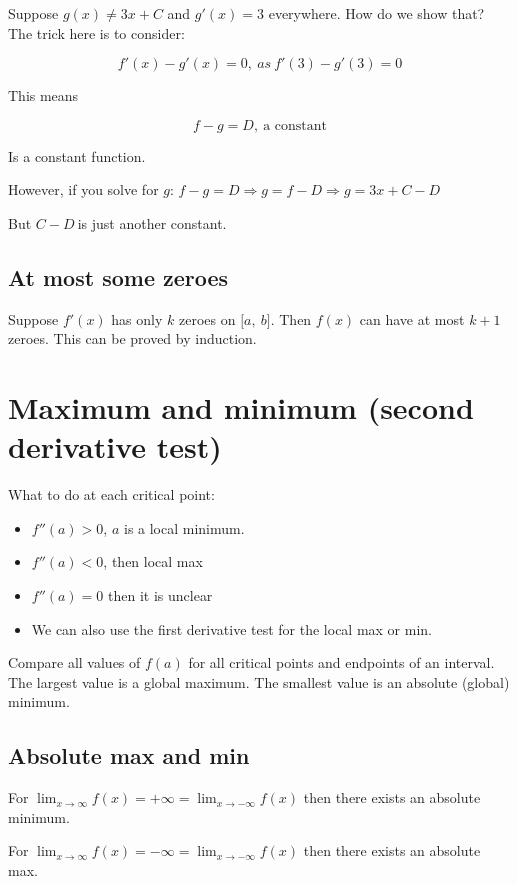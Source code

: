 \documentclass[
]{article}
\begin{document}
Suppose $g(x) \neq 3x + C$ and $g'(x) = 3$ everywhere. How do we
show that? The trick here is to consider:

$$f'(x) - g'(x) = 0,\ as\ f'(3) - g'(3) = 0$$

This means

$$f - g = D,\ \text{a\ constant}$$

Is a constant function.

However, if you solve for $g$:
$f - g = D \Rightarrow g = f - D \Rightarrow g = 3x + C - D$

But $C - D\ $is just another constant.


\subsection{At most some zeroes}

Suppose $f'(x)$ has only $k$ zeroes on $\lbrack a,\ b\rbrack$.
Then $f(x)$ can have at most $k + 1$ zeroes. This can be proved by
induction.


\section{Maximum and minimum (second derivative
test)}

What to do at each critical point:

\begin{itemize}
\item
  $f''(a) > 0$, $a$ is a local minimum.
\item
  $f''(a) < 0$, then local max
\item
  $f''(a) = 0$ then it is unclear
\item
  We can also use the first derivative test for the local max or min.
\end{itemize}

Compare all values of $f(a)$ for all critical points and endpoints of
an interval. The largest value is a global maximum. The smallest value
is an absolute (global) minimum.


\subsection{Absolute max and min}

For
$\lim_{x \rightarrow \infty}{f(x)} = + \infty = \lim_{x \rightarrow - \infty}{f(x)}$
then there exists an absolute minimum.

For
$\lim_{x \rightarrow \infty}{f(x)} = - \infty = \lim_{x \rightarrow - \infty}{f(x)}$
then there exists an absolute max.
\end{document}
